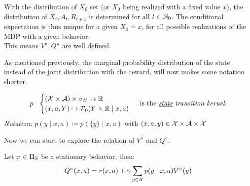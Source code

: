 \begin{remark}
With the distribution of \(X_0\) set (or \(X_0\) being realized with a fixed value \(x\)), the distribution of \(X_t, A_t,R_{t+1}\) is determined for all \(t\in\mathbb{N}_0\). The conditional expectation is thus unique for a given \(X_0=x\), for all possible realizations of the MDP with a given behavior. \\
This means \(V^\pi, Q^\pi\) are well defined.
\end{remark}

As mentioned previously, the marginal probability distribution of the state instead of the joint distribution with the reward, will now makes some notation shorter.  
\begin{definition}
	\[
	p\colon 
	\begin{cases}
		(\mathcal{X}\times\mathcal{A})\times\sigma_{\mathcal{X}}\to\mathbb{R}\\
		(x,a,Y)\mapsto \mathcal{P}_0(Y\times\mathbb{R}\mid x,a)
	\end{cases}\text{ is the \emph{\underline{state} transition kernel}.}
	\] 
\emph{Notation:} \(p(y\mid x,a)\coloneqq p(\{y\}\mid x,a)\) with \((x,a,y)\in\mathcal{X}\times\mathcal{A}\times\mathcal{X}\)
\end{definition}

Now we can start to explore the relation of \(V^\pi\) and \(Q^\pi\).

\begin{prop}\label{expand Q^pi} Let \(\pi\in\Pi_S\) be a stationary behavior, then:
	\[Q^\pi(x,a)=r(x,a)+\gamma\sum_{y\in\mathcal{X}}p(y\mid x,a)V^\pi(y)	\]
\end{prop}

